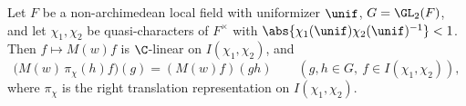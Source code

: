 Let $F$ be a non-archimedean local field with uniformizer $\unif$, $G=\GL_2(F)$, and let $\chi_1,\chi_2$ be
quasi-characters of $F^\times$ with $\abs{\chi_1(\unif)\chi_2(\unif)^{-1}}<1$. Then $f\mapsto M(w)f$ is $\C$-linear on
$I(\chi_1,\chi_2)$, and
\[
  \bigl(M(w)\,\pi_\chi(h)f\bigr)(g)=(M(w)f)(gh)\qquad(g,h\in G,\ f\in I(\chi_1,\chi_2)),
\]
where $\pi_\chi$ is the right translation representation on $I(\chi_1,\chi_2)$.
